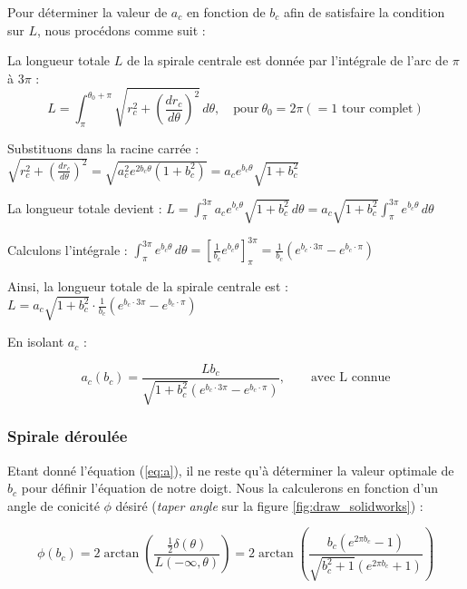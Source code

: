 \documentclass[a4paper, 11pt]{report}
\begin{document}
            Pour déterminer la valeur de \( a_c \) en fonction de $b_c$ afin de satisfaire la condition sur $L$, nous procédons comme suit :

            La longueur totale \( L \) de la spirale centrale est donnée par l'intégrale de l'arc de \( \pi \) à \( 3\pi \) :
            \[
            L = \int_\pi^{\theta_0 +\pi} \sqrt{r_c^2 + \left(\frac{dr_c}{d\theta}\right)^2} \, d\theta, \quad \text{pour} \ \theta_0 = 2\pi \left( = 1 \text{ tour complet} \right)
            \]
            
            Substituons dans la racine carrée : $\sqrt{r_c^2 + \left( \frac{dr_c}{d\theta} \right)^2} = \sqrt{a_c^2 e^{2b_c \theta} (1 + b_c^2)} = a_c e^{b_c \theta} \sqrt{1 + b_c^2}$
            
            La longueur totale devient : $L = \int_\pi^{3\pi} a_c e^{b_c \theta} \sqrt{1 + b_c^2} \, d\theta = a_c \sqrt{1 + b_c^2} \int_\pi^{3\pi} e^{b_c \theta} \, d\theta$
            
            Calculons l'intégrale : $\int_\pi^{3\pi} e^{b_c \theta} \, d\theta = \left[ \frac{1}{b_c} e^{b_c \theta} \right]_\pi^{3\pi} = \frac{1}{b_c} \left( e^{b_c \cdot 3\pi} - e^{b_c \cdot \pi} \right)$
            
            Ainsi, la longueur totale de la spirale centrale est : $L = a_c \sqrt{1 + b_c^2} \cdot \frac{1}{b_c} \left( e^{b_c \cdot 3\pi} - e^{b_c \cdot \pi} \right)$
            
            En isolant \( a_c \) :

            \begin{equation}
            a_c(b_c) = \frac{L b_c}{\sqrt{1 + b_c^2} \left( e^{b_c \cdot 3\pi} - e^{b_c \cdot \pi} \right)}, \qquad \text{avec L connue}
            \label{eq:a}
            \end{equation}

        \subsubsection{Spirale déroulée}

            Etant donné l'équation (\ref{eq:a}), il ne reste qu'à déterminer la valeur optimale de $b_c$ pour définir l'équation de notre doigt. Nous la calculerons en fonction d'un angle de conicité $\phi$ désiré (\textit{taper angle} sur la figure \ref{fig:draw_solidworks}) :

            \begin{equation}
            \phi(b_c) = 2\arctan \left(
                \frac{\frac{1}{2}\delta(\theta)}{L(-\infty, \theta)}
                \right) = 2 \arctan\left(\frac{b_c(e^{2\pi b_c}-1)}{\sqrt{b_c^2+1} \left(e^{2\pi b_c}+1\right)}\right)
            \label{eq:angle_de_conicite}
            \end{equation}
\end{document}
